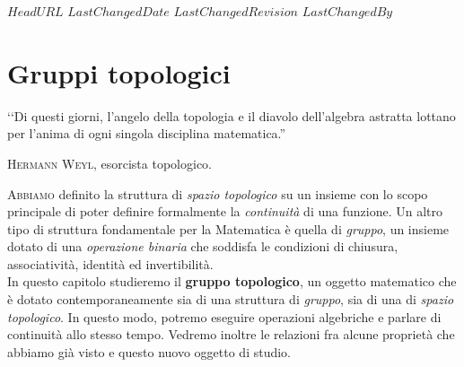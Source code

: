 \svnidlong
{$HeadURL$}
{$LastChangedDate$}
{$LastChangedRevision$}
{$LastChangedBy$}

\chapter{Gruppi topologici}

\begin{introduction}
‘‘Di questi giorni, l'angelo della topologia e il diavolo dell'algebra astratta lottano per l'anima di ogni singola disciplina matematica.''
\begin{flushright}
	\textsc{Hermann Weyl,} esorcista topologico.
\end{flushright}
\end{introduction}
\lettrine[findent=1pt, nindent=0pt]{A}{bbiamo} definito la struttura di \textit{spazio topologico} su un insieme con lo scopo principale di poter definire formalmente la \textit{continuità} di una funzione. Un altro tipo di struttura fondamentale per la Matematica è quella di \textit{gruppo}, un insieme dotato di una \textit{operazione binaria} che soddisfa le condizioni di chiusura, associatività, identità ed invertibilità.\\
In questo capitolo studieremo il \textbf{gruppo topologico}, un oggetto matematico che è dotato contemporaneamente sia di una struttura di \textit{gruppo}, sia di una di \textit{spazio topologico}. In questo modo, potremo eseguire operazioni algebriche e parlare di continuità allo stesso tempo. Vedremo inoltre le relazioni fra alcune proprietà che abbiamo già visto e questo nuovo oggetto di studio.
